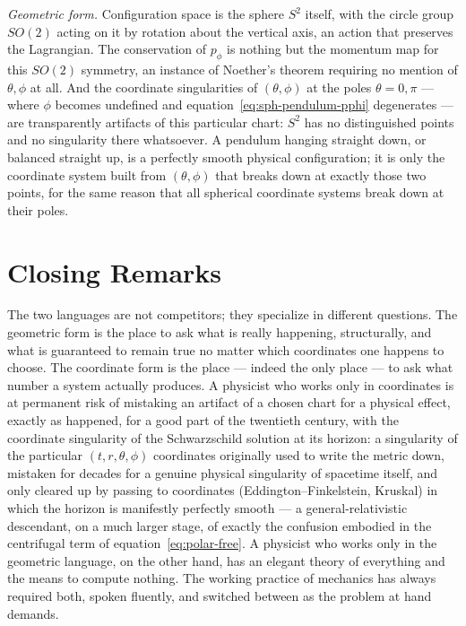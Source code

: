 \emph{Geometric form.} Configuration space is the sphere $S^2$
itself, with the circle group $SO(2)$ acting on it by rotation about
the vertical axis, an action that preserves the Lagrangian. The
conservation of $p_\phi$ is nothing but the momentum map for this
$SO(2)$ symmetry, an instance of Noether's theorem requiring no
mention of $\theta,\phi$ at all. And the coordinate singularities of
$(\theta,\phi)$ at the poles $\theta=0,\pi$ --- where $\phi$ becomes
undefined and equation~\eqref{eq:sph-pendulum-pphi} degenerates ---
are transparently artifacts of this particular chart: $S^2$ has no
distinguished points and no singularity there whatsoever. A pendulum
hanging straight down, or balanced straight up, is a perfectly smooth
physical configuration; it is only the coordinate system built from
$(\theta,\phi)$ that breaks down at exactly those two points, for the
same reason that all spherical coordinate systems break down at their
poles.

\section{Closing Remarks}

The two languages are not competitors; they specialize in different
questions. The geometric form is the place to ask what is really
happening, structurally, and what is guaranteed to remain true no
matter which coordinates one happens to choose. The coordinate form
is the place --- indeed the only place --- to ask what number a
system actually produces. A physicist who works only in coordinates
is at permanent risk of mistaking an artifact of a chosen chart for a
physical effect, exactly as happened, for a good part of the
twentieth century, with the coordinate singularity of the
Schwarzschild solution at its horizon: a singularity of the
particular $(t,r,\theta,\phi)$ coordinates originally used to write
the metric down, mistaken for decades for a genuine physical
singularity of spacetime itself, and only cleared up by passing to
coordinates (Eddington--Finkelstein, Kruskal) in which the horizon is
manifestly perfectly smooth --- a general-relativistic descendant, on
a much larger stage, of exactly the confusion embodied in the
centrifugal term of equation~\eqref{eq:polar-free}. A physicist who
works only in the geometric language, on the other hand, has an
elegant theory of everything and the means to compute nothing. The
working practice of mechanics has always required both, spoken
fluently, and switched between as the problem at hand demands.

